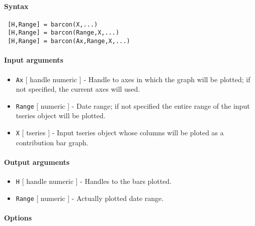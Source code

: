 


	\paragraph{Syntax}
 
 \begin{verbatim}
 [H,Range] = barcon(X,...)
 [H,Range] = barcon(Range,X,...)
 [H,Range] = barcon(Ax,Range,X,...)
 \end{verbatim}
 
 \paragraph{Input arguments}
 
 \begin{itemize}
 \item
   \texttt{Ax} {[} handle \textbar{} numeric {]} - Handle to axes in
   which the graph will be plotted; if not specified, the current axes
   will used.
 \item
   \texttt{Range} {[} numeric {]} - Date range; if not specified the
   entire range of the input tseries object will be plotted.
 \item
   \texttt{X} {[} tseries {]} - Input tseries object whose columns will
   be ploted as a contribution bar graph.
 \end{itemize}
 
 \paragraph{Output arguments}
 
 \begin{itemize}
 \item
   \texttt{H} {[} handle \textbar{} numeric {]} - Handles to the bars
   plotted.
 \item
   \texttt{Range} {[} numeric {]} - Actually plotted date range.
 \end{itemize}
 
 \paragraph{Options}
 
